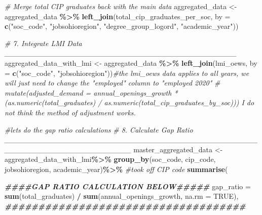 \documentclass[
]{article}
\newenvironment{Shaded}{\begin{snugshade}}{\end{snugshade}}
\newcommand{\AttributeTok}[1]{\textcolor[rgb]{0.13,0.29,0.53}{#1}}
\newcommand{\CommentTok}[1]{\textcolor[rgb]{0.56,0.35,0.01}{\textit{#1}}}
\newcommand{\ConstantTok}[1]{\textcolor[rgb]{0.56,0.35,0.01}{#1}}
\newcommand{\DocumentationTok}[1]{\textcolor[rgb]{0.56,0.35,0.01}{\textbf{\textit{#1}}}}
\newcommand{\FunctionTok}[1]{\textcolor[rgb]{0.13,0.29,0.53}{\textbf{#1}}}
\newcommand{\NormalTok}[1]{#1}
\newcommand{\OtherTok}[1]{\textcolor[rgb]{0.56,0.35,0.01}{#1}}
\newcommand{\SpecialCharTok}[1]{\textcolor[rgb]{0.81,0.36,0.00}{\textbf{#1}}}
\newcommand{\StringTok}[1]{\textcolor[rgb]{0.31,0.60,0.02}{#1}}
\begin{document}
\begin{Shaded}
\begin{Highlighting}[]
\CommentTok{\# Merge total CIP graduates back with the main data}
\NormalTok{aggregated\_data }\OtherTok{\textless{}{-}}\NormalTok{ aggregated\_data }\SpecialCharTok{\%\textgreater{}\%}
  \FunctionTok{left\_join}\NormalTok{(total\_cip\_graduates\_per\_soc, }\AttributeTok{by =} \FunctionTok{c}\NormalTok{(}\StringTok{"soc\_code"}\NormalTok{, }\StringTok{"jobsohioregion"}\NormalTok{, }\StringTok{"degree\_group\_logord"}\NormalTok{, }\StringTok{"academic\_year"}\NormalTok{))}

\CommentTok{\# 7. Integrate LMI Data  \_\_\_\_\_\_\_\_\_\_\_\_\_\_\_\_\_\_\_\_\_\_\_\_\_\_\_\_\_\_\_\_\_\_\_\_\_\_\_\_\_\_\_\_}
\NormalTok{aggregated\_data\_with\_lmi }\OtherTok{\textless{}{-}}\NormalTok{ aggregated\_data }\SpecialCharTok{\%\textgreater{}\%}
  \FunctionTok{left\_join}\NormalTok{(lmi\_oews, }\AttributeTok{by =} \FunctionTok{c}\NormalTok{(}\StringTok{"soc\_code"}\NormalTok{, }\StringTok{"jobsohioregion"}\NormalTok{))}\CommentTok{\#the lmi\_oews data applies to all years, we will just need to change the "employed" column to "employed 2020"}
  \CommentTok{\# mutate(adjusted\_demand = annual\_openings\_growth * (as.numeric(total\_graduates) / as.numeric(total\_cip\_graduates\_by\_soc)))  I do not think the method of adjustment works. }


\CommentTok{\#lets do the gap ratio calculations}
\CommentTok{\# 8. Calculate Gap Ratio \_\_\_\_\_\_\_\_\_\_\_\_\_\_\_\_\_\_\_\_\_\_\_\_\_\_\_\_\_\_\_\_\_\_\_\_\_\_\_\_\_\_\_\_\_\_\_\_\_\_\_\_\_\_\_\_\_\_\_\_\_\_\_\_\_\_\_\_\_\_\_\_}
\NormalTok{master\_aggregated\_data }\OtherTok{\textless{}{-}}\NormalTok{ aggregated\_data\_with\_lmi}\SpecialCharTok{\%\textgreater{}\%}
  \FunctionTok{group\_by}\NormalTok{(soc\_code, cip\_code, jobsohioregion, academic\_year)}\SpecialCharTok{\%\textgreater{}\%} \CommentTok{\#took off CIP code}
  \FunctionTok{summarise}\NormalTok{(}
    
                          \DocumentationTok{\#\#\#\#GAP RATIO CALCULATION BELOW\#\#\#\#\#}
         \AttributeTok{gap\_ratio  =} \FunctionTok{sum}\NormalTok{(total\_graduates) }\SpecialCharTok{/} \FunctionTok{sum}\NormalTok{(annual\_openings\_growth, }\AttributeTok{na.rm =} \ConstantTok{TRUE}\NormalTok{),}
                          \DocumentationTok{\#\#\#\#\#\#\#\#\#\#\#\#\#\#\#\#\#\#\#\#\#\#\#\#\#\#\#\#\#\#\#\#\#\#\#\#}
         

\end{Highlighting}
\end{Shaded}
\end{document}
